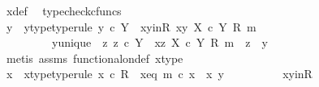 \begin{isabellebody}
\ x{\isacharunderscore}{\kern0pt}def\ \isamarkupfalse%
\ typecheck{\isacharunderscore}{\kern0pt}cfuncs\isanewline
\isanewline
\ \ \ \ \ \ \isamarkupfalse%
\ y\ \ y{\isacharunderscore}{\kern0pt}type{\isacharbrackleft}{\kern0pt}type{\isacharunderscore}{\kern0pt}rule{\isacharbrackright}{\kern0pt}{\isacharcolon}{\kern0pt}\ {\isachardoublequoteopen}y\ {\isasymin}\isactrlsub c\ Y{\isachardoublequoteclose}\ \ x{\isacharunderscore}{\kern0pt}y{\isacharunderscore}{\kern0pt}in{\isacharunderscore}{\kern0pt}R{\isacharcolon}{\kern0pt}\ {\isachardoublequoteopen}{\isasymlangle}x{\isacharcomma}{\kern0pt}y{\isasymrangle}\ {\isasymin}\isactrlbsub X\ {\isasymtimes}\isactrlsub c\ Y\isactrlesub \ {\isacharparenleft}{\kern0pt}R{\isacharcomma}{\kern0pt}\ m{\isacharparenright}{\kern0pt}{\isachardoublequoteclose}\isanewline
\ \ \ \ \ \ \ \ \ y{\isacharunderscore}{\kern0pt}unique{\isacharcolon}{\kern0pt}\ {\isachardoublequoteopen}{\isasymforall}\ z{\isachardot}{\kern0pt}\ {\isacharparenleft}{\kern0pt}z\ {\isasymin}\isactrlsub c\ Y\ {\isasymand}\ {\isasymlangle}x{\isacharcomma}{\kern0pt}z{\isasymrangle}\ {\isasymin}\isactrlbsub X\ {\isasymtimes}\isactrlsub c\ Y\isactrlesub \ {\isacharparenleft}{\kern0pt}R{\isacharcomma}{\kern0pt}\ m{\isacharparenright}{\kern0pt}{\isacharparenright}{\kern0pt}\ {\isasymlongrightarrow}\ z\ {\isacharequal}{\kern0pt}\ y{\isachardoublequoteclose}\isanewline
\ \ \ \ \ \ \ \ \isamarkupfalse%
\ {\isacharparenleft}{\kern0pt}metis\ assms\ functional{\isacharunderscore}{\kern0pt}on{\isacharunderscore}{\kern0pt}def\ x{\isacharunderscore}{\kern0pt}type{\isacharparenright}{\kern0pt}\isanewline
\isanewline
\ \ \ \ \ \ \isamarkupfalse%
\ x{\isacharprime}{\kern0pt}\ \ x{\isacharprime}{\kern0pt}{\isacharunderscore}{\kern0pt}type{\isacharbrackleft}{\kern0pt}type{\isacharunderscore}{\kern0pt}rule{\isacharbrackright}{\kern0pt}{\isacharcolon}{\kern0pt}\ {\isachardoublequoteopen}x{\isacharprime}{\kern0pt}\ {\isasymin}\isactrlsub c\ R{\isachardoublequoteclose}\ \ x{\isacharprime}{\kern0pt}{\isacharunderscore}{\kern0pt}eq{\isacharcolon}{\kern0pt}\ {\isachardoublequoteopen}m\ {\isasymcirc}\isactrlsub c\ x{\isacharprime}{\kern0pt}\ {\isacharequal}{\kern0pt}\ {\isasymlangle}x{\isacharcomma}{\kern0pt}\ y{\isasymrangle}{\isachardoublequoteclose}\isanewline
\ \ \ \ \ \ \ \ \isamarkupfalse%
\ x{\isacharunderscore}{\kern0pt}y{\isacharunderscore}{\kern0pt}in{\isacharunderscore}{\kern0pt}R\ \isamarkupfalse%

\end{isabellebody}
